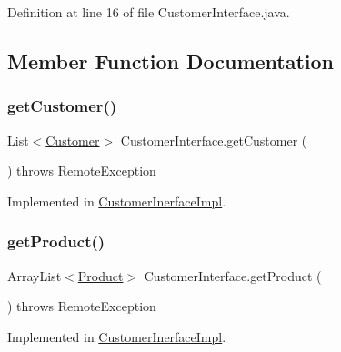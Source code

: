 Definition at line 16 of file Customer\+Interface.\+java.



\subsection{Member Function Documentation}
\mbox{\label{interface_customer_interface_ae6fd6f70022bbb0e6600c7bcaf3e139c}} 
\subsubsection{\texorpdfstring{getCustomer()}{getCustomer()}}
{\footnotesize\ttfamily List$<$\mbox{\hyperlink{class_customer}{Customer}}$>$ Customer\+Interface.\+get\+Customer (\begin{DoxyParamCaption}{ }\end{DoxyParamCaption}) throws Remote\+Exception}



Implemented in \mbox{\hyperlink{class_customer_inerface_impl_a488e7019e10ff327c1ddda2df06aafc2}{Customer\+Inerface\+Impl}}.

\mbox{\label{interface_customer_interface_a671bbfd3dfb9bbc58d3c9d04f38da627}} 
\subsubsection{\texorpdfstring{getProduct()}{getProduct()}}
{\footnotesize\ttfamily Array\+List$<$\mbox{\hyperlink{class_product}{Product}}$>$ Customer\+Interface.\+get\+Product (\begin{DoxyParamCaption}{ }\end{DoxyParamCaption}) throws Remote\+Exception}



Implemented in \mbox{\hyperlink{class_customer_inerface_impl_aae8b5ef23db5d8e651663cd8e29ac013}{Customer\+Inerface\+Impl}}.

\mbox{\label{interface_customer_interface_aded022cc5a8b728bc07ded2267fd4f07}} 
